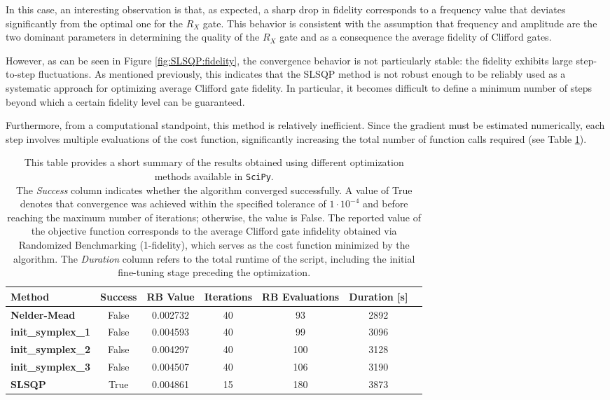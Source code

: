 In this case, an interesting observation is that, as expected, a sharp drop in fidelity corresponds to a frequency value that deviates significantly from the optimal one for the $R_X$ gate.
This behavior is consistent with the assumption that frequency and amplitude are the two dominant parameters in determining the quality of the $R_X$ gate and as a consequence  the average fidelity of Clifford gates.

However, as can be seen in Figure \ref{fig:SLSQP:fidelity}, the convergence behavior is not particularly stable: the fidelity exhibits large step-to-step fluctuations. 
As mentioned previously, this indicates that the SLSQP method is not robust enough to be reliably used as a systematic approach for optimizing average Clifford gate fidelity.
In particular, it becomes difficult to define a minimum number of steps beyond which a certain fidelity level can be guaranteed.

Furthermore, from a computational standpoint, this method is relatively inefficient. 
Since the gradient must be estimated numerically, each step involves multiple evaluations of the cost function, significantly increasing the total number of function calls required (see Table \ref{tab:scipy_opt}).

\begin{table}[h]
    \centering
    \begin{tabular}{lcccccc}
        \toprule
        \textbf{Method} & \textbf{Success} & \textbf{RB Value} & \textbf{Iterations} & \textbf{RB Evaluations} & \textbf{Duration [s]}\\
        \midrule
        \textbf{Nelder-Mead} & False & 0.002732 & 40 & 93 & 2892 \\
        \textbf{init\_symplex\_1} & False &  0.004593 & 40 & 99 & 3096\\
        \textbf{init\_symplex\_2} & False & 0.004297 & 40 & 100 & 3128\\
        \textbf{init\_symplex\_3} & False & 0.004507 & 40 & 106 & 3190\\
        \textbf{SLSQP} & True & 0.004861 & 15 & 180 & 3873\\
        \bottomrule
    \end{tabular}
    \caption{This table provides a short summary of the results obtained using different optimization methods available in \texttt{SciPy}.\\ 
    The \textit{Success} column indicates whether the algorithm converged successfully. 
    A value of True denotes that convergence was achieved within the specified tolerance of $1\cdot10^{-4}$ and before reaching the maximum number of iterations; otherwise, the value is False.
    The reported value of the objective function corresponds to the average Clifford gate infidelity obtained via Randomized Benchmarking (1-fidelity), which serves as the cost function minimized by the algorithm.
    The \textit{Duration} column refers to the total runtime of the script, including the initial fine-tuning stage preceding the optimization.\\}
    \label{tab:scipy_opt}
\end{table}


